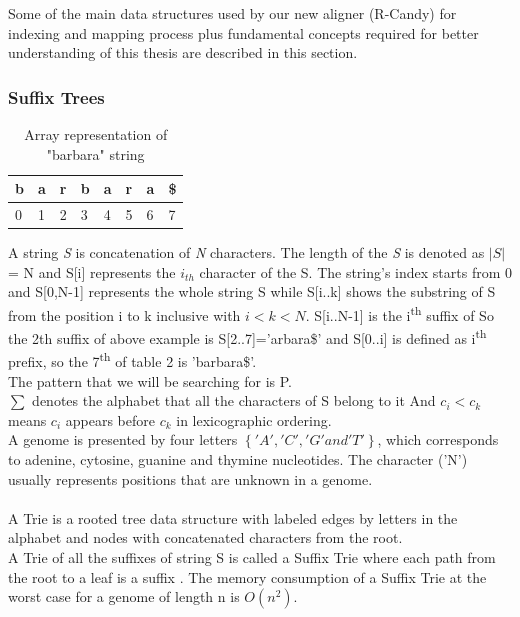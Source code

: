 \documentclass[11pt,a4paper]{report}
\begin{document}
Some of the main data structures used by our new aligner (R-Candy)
for indexing and mapping process plus fundamental concepts required
for better understanding of this thesis are described in this section. 





\subsubsection{Suffix Trees} \label{Suffix Trees}

\begin{table}[h]
 \centering
  \begin{tabular}{ | p{0.5cm} | p{0.5cm} | p{0.5cm} 
  |p{0.5cm} |p{0.5cm} |p{0.5cm} |p{0.5cm} |p{0.5cm} |}
    \hline
  \textbf{b} & \textbf{a } &\textbf{r}  &\textbf{b} 
  &\textbf{a} &\textbf{r} &\textbf{a} &\textbf{\$}\\ \hline
       0 & 1 &2&3&4&5&6&7 \\ \hline
      
   \end{tabular}
\caption{Array representation of "barbara" string}
\label{Array-representation}
\end{table}



A string \emph{S} is concatenation of \emph{N} characters. 
The length of the \emph{S} is denoted as $\lvert S \rvert$ 
= N and S[i] represents the $i_{th}$ character of the S.
The string's index starts from 0 and S[0,N-1] represents 
the whole string S while S[i..k] shows the substring of S 
from the position i to k inclusive with $i < k < N$. 
S[i..N-1] is the i\textsuperscript{th} suffix of So the 
2th suffix of above example is S[2..7]='arbara\$' and
S[0..i] is defined as i\textsuperscript{th} prefix, so 
the 7\textsuperscript{th} of table 2 is 'barbara\$'.\\
The pattern that we will be searching for is P.\\
$ \sum $  denotes the alphabet that all the characters of 
S belong to it And $ c_{i} < c_{k}$ means $c_{i}$ appears 
before $c_{k}$ in lexicographic ordering.\\
A genome is presented by four letters $\left\{ 'A', 'C', 
'G' and 'T'\right\}$, which corresponds to adenine, cytosine, 
guanine and thymine nucleotides. The character ('N') usually 
represents positions that are unknown in a genome.
\\\\
A Trie is a rooted tree data structure with labeled edges 
by letters in the alphabet and nodes with concatenated 
characters from the root\cite{trie}.\\ 
A Trie of all the suffixes of string S is called a Suffix 
Trie where each path from the root to a leaf is a suffix 
\cite{gusfield1997algorithms}.
The memory consumption of a Suffix Trie at the worst case 
for a genome of length n is  $O (n^{2})$.
\end{document}
